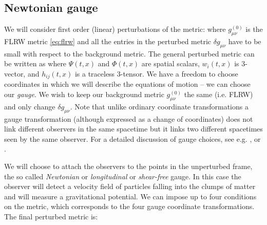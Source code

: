 \subsection{Newtonian gauge}
We will consider first order (linear) perturbations of the metric:
where $g_{\mu\nu}^{(0)}$ is the FLRW metric \eqref{eq:flrw} and all the entries in the perturbed metric $\delta g_{\mu\nu}$ have to be small with respect to the background metric. The general perturbed metric can be written as
where $\Psi(t,x)$ and $\Phi(t,x)$ are spatial scalars, $w_i(t,x)$ is 3-vector, and $h_{ij}(t,x)$ is a traceless 3-tensor. We have a freedom to choose coordinates in which we will describe the equations of motion -- we can choose our \textit{gauge}. We wish to keep our background metric $g_{\mu\nu}^{(0)}$ the same (i.e. FLRW) and only change $\delta g_{\mu\nu}$. Note that unlike ordinary coordinate transformations a gauge transformation (although expressed as a change of coordinates) does not link different observers in the same spacetime but it links two different spacetimes seen by the same observer. For a detailed discussion of gauge choices, see e.g. \textcite{PhysRevD.40.1804}, \textcite{10.1143/PTPS.78.1} or \textcite{PhysRevD.22.1882}.

We will choose to attach the observers to the points in the unperturbed frame, the so called \textit{Newtonian} or \textit{longitudinal} or \textit{shear-free} gauge. In this case the observer will detect a velocity field of particles falling into the clumps of matter and will measure a gravitational potential. We can impose up to four conditions on the metric, which corresponds to the four gauge coordinate transformations. The final perturbed metric is:
